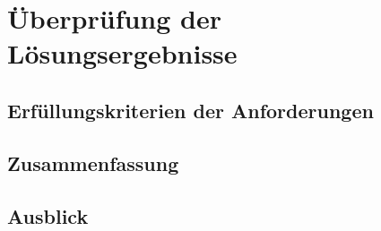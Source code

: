 \section{Überprüfung der Lösungsergebnisse}
\subsection{Erfüllungskriterien der Anforderungen}
\subsection{Zusammenfassung}
\subsection{Ausblick}
